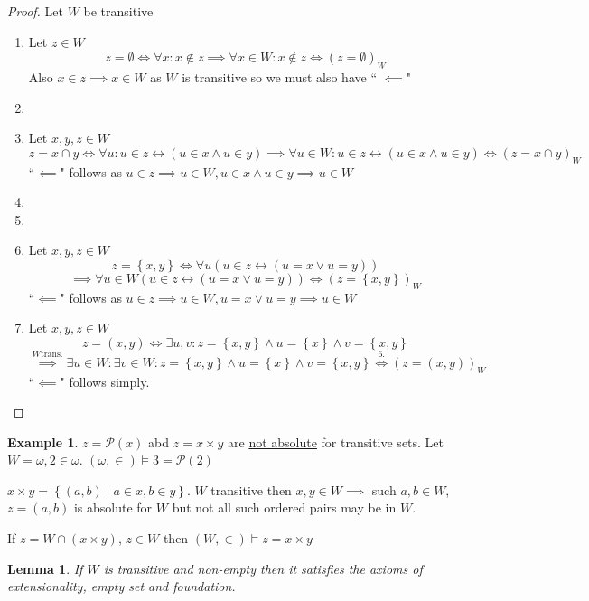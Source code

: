 \documentclass{scrartcl}
\renewcommand{\P}{\mathcal{P}}
\newcommand{\set}[1]{\left\{#1\right\}}
\theoremstyle{definition}
\newtheorem*{example*}{Example}
\theoremstyle{plain}
\newtheorem*{lemma*}{Lemma}
\theoremstyle{remark}
\begin{document}
	\begin{proof}
		Let $W$ be transitive
		\begin{enumerate}[1.]
			\item Let $z \in W$
				\[z = \emptyset \iff \forall x: x \notin z \implies\forall x \in W: x \notin z  \iff (z=\emptyset)_W\]
			Also $x\in z \implies x \in W$ as $W$ is transitive so we must also have `` $\impliedby$"
			\item 
			\item Let $x, y, z \in W$
			\[z=x\cap y \iff \forall u: u \in z \leftrightarrow (u \in x \land u \in y) \implies \forall u \in W: u \in z \leftrightarrow (u \in x \land u \in y) \iff (z = x \cap y)_W\]
			``$\impliedby$" follows as $u \in z \implies u \in W, u \in x \land u \in y \implies u \in W$ 
			\item 
			\item 
			\item Let $x, y, z \in W$
				\[z = \set{x, y} \iff \forall u ( u \in z \leftrightarrow (u = x \lor u = y)) \] \[\implies \forall u \in W(u \in z \leftrightarrow (u=x \lor u = y)) \iff (z=\set{x,y})_W\]
				``$\impliedby$" follows as $u \in z \implies u \in W, u = x \lor u = y \implies u \in W$
			\item Let $x, y, z \in W$
				\[z = (x, y) \iff \exists u, v: z = \set{x, y} \land u = \set{x} \land v = \set{x, y}\]
				\[\overset{W \text{trans.}}{\implies} \exists u \in W: \exists v \in W: z = \set{x, y} \land u = \set{x} \land v = \set{x, y} \overset{6.}{\iff} (z = (x,y))_W\]
				``$\impliedby$" follows simply.
		\end{enumerate}
	\end{proof}

	\begin{example*}
		$z= \P(x)$ abd $z = x \times y$ are \underline{not absolute} for transitive sets. Let $W = \omega, 2 \in \omega$. $(\omega, \in) \vDash 3 = \P(2)$
		
		$x \times y = \set{(a,b) \mid a \in x, b \in y}$. $W$ transitive then $x, y \in W \implies$ such $a, b \in W$, $z = (a, b)$ is absolute for $W$ but not all such ordered pairs may be in $W$.
		
		If $z = W \cap (x \times y)$, $z \in W$ then $(W, \in) \vDash z = x \times y$
	\end{example*}

	\begin{lemma*}
		If $W$ is transitive and non-empty then it satisfies the axioms of extensionality, empty set and foundation.
	\end{lemma*}
	
\end{document}
